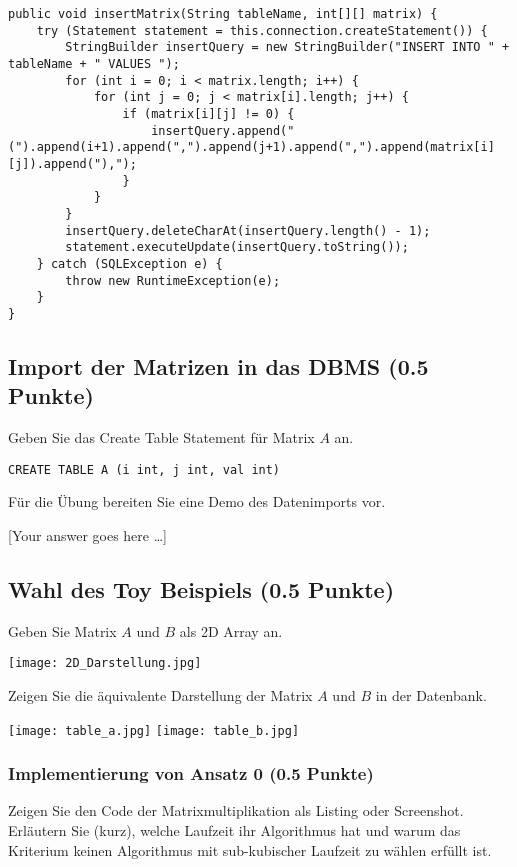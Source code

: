 \documentclass[11pt]{scrartcl}
\newcommand{\youranswerhere}{[Your answer goes here \ldots]}
\begin{document}
\begin{lstlisting}[style=dmrJava]
public void insertMatrix(String tableName, int[][] matrix) {
    try (Statement statement = this.connection.createStatement()) {
        StringBuilder insertQuery = new StringBuilder("INSERT INTO " + tableName + " VALUES ");
        for (int i = 0; i < matrix.length; i++) {
            for (int j = 0; j < matrix[i].length; j++) {
                if (matrix[i][j] != 0) {
                    insertQuery.append("(").append(i+1).append(",").append(j+1).append(",").append(matrix[i][j]).append("),");
                }
            }
        }
        insertQuery.deleteCharAt(insertQuery.length() - 1);
        statement.executeUpdate(insertQuery.toString());
    } catch (SQLException e) {
        throw new RuntimeException(e);
    }
}
\end{lstlisting}

\subsection*{Import der Matrizen in das DBMS (0.5 Punkte)}

Geben Sie das Create Table Statement für Matrix $A$ an.

\begin{lstlisting}[style=dmrsql]
  CREATE TABLE A (i int, j int, val int)
\end{lstlisting}

Für die Übung bereiten Sie eine Demo des Datenimports vor.


\youranswerhere{}

\subsection*{Wahl des Toy Beispiels (0.5 Punkte)}

Geben Sie Matrix $A$ und $B$ als 2D Array an.

\texttt{[image: 2D\_Darstellung.jpg]}

Zeigen Sie die äquivalente Darstellung der Matrix $A$ und $B$ in der Datenbank.

\texttt{[image: table\_a.jpg]}
\texttt{[image: table\_b.jpg]}

\subsubsection*{Implementierung von Ansatz 0 (0.5 Punkte)}

Zeigen Sie den Code der Matrixmultiplikation als Listing oder Screenshot. Erläutern Sie (kurz), welche Laufzeit ihr Algorithmus hat und warum das Kriterium keinen Algorithmus mit sub-kubischer Laufzeit zu wählen erfüllt ist. 
\end{document}
